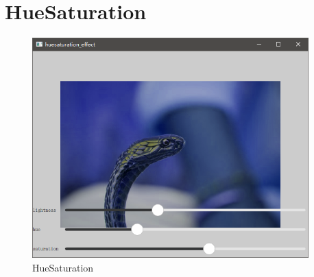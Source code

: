 ﻿




\FloatBarrier
\section{
HueSaturation
}\label{c000015s000008}


\begin{figure}[htb] %
\marginnote{\setlength\fboxsep{2pt}\fbox{\footnotesize{\kaishu\figurename\,}\footnotesize{\ref{p000024}}}}\centering %
\includegraphics[width=0.95\textwidth]{../chapter06/huesaturation_effect/the_app.png} %
\caption{HueSaturation} %
\label{p000024} %
\end{figure}


